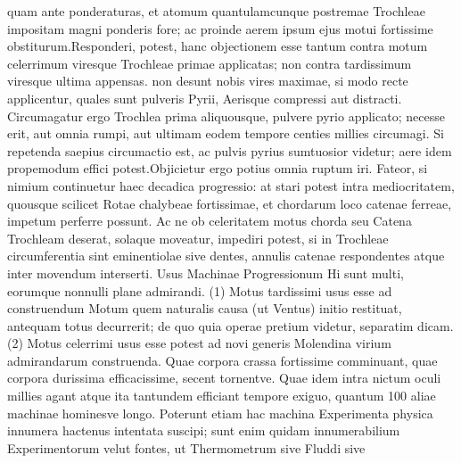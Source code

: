 quam ante ponderaturas, et atomum quantulamcunque  postremae Trochleae\protect{} impositam magni ponderis\protect{} fore; ac proinde aerem ipsum ejus motui fortissime obstiturum.\pend \pstart Responderi, potest,  hanc objectionem esse tantum contra motum celerrimum viresque Trochleae\protect{} primae applicatas; non contra tardissimum viresque ultima appensas.  non desunt nobis vires maximae, si modo recte applicentur, quales sunt pulveris Pyrii\protect{}, Aerisque compressi aut distracti. Circumagatur ergo Trochlea\protect{} prima aliquousque, pulvere pyrio\protect{} applicato; necesse erit, aut omnia rumpi, aut ultimam eodem tempore centies millies circumagi. Si repetenda saepius circumactio est, ac pulvis pyrius\protect{} sumtuosior videtur; aere idem propemodum effici potest.\pend \pstart  Objicietur ergo potius omnia ruptum iri. Fateor, si nimium continuetur haec decadica progressio: at stari potest intra mediocritatem, quousque scilicet Rotae chalybeae fortissimae, et chordarum loco catenae ferreae, impetum perferre possunt. Ac ne ob celeritatem motus chorda seu Catena Trochleam\protect{} deserat, solaque moveatur, impediri potest, si in Trochleae\protect{} circumferentia sint eminentiolae sive dentes, annulis catenae respondentes atque inter movendum interserti. \pend \vspace{2.0ex} \pstart \centering Usus Machinae Progressionum\protect{} \pend \vspace{1.0ex} \pstart Hi sunt multi, eorumque nonnulli plane admirandi. \pend \pstart (1) Motus tardissimi usus esse  ad construendum Motum \protect{} quem naturalis causa (ut Ventus)  initio restituat, antequam totus decurrerit; de quo quia operae pretium videtur, separatim dicam.\pend \pstart (2) Motus celerrimi usus esse potest ad novi generis Molendina\protect{} virium admirandarum construenda. Quae corpora crassa fortissime comminuant, quae corpora durissima efficacissime, secent tornentve.  Quae idem intra nictum oculi millies agant atque ita tantundem efficiant tempore exiguo, quantum 100 aliae machinae hominesve longo. Poterunt etiam hac machina Experimenta physica innumera hactenus intentata suscipi; sunt enim quidam innumerabilium Experimentorum velut fontes, ut Thermometrum sive Fluddi\protect{} sive 